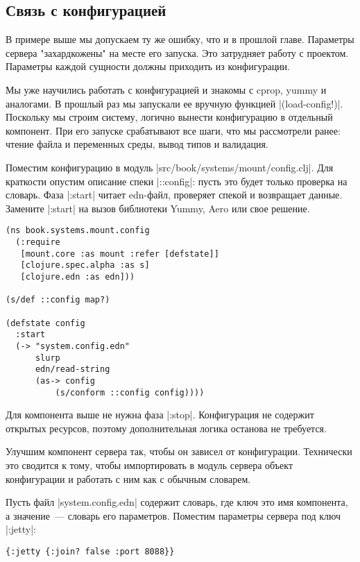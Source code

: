 \subsection{Связь с конфигурацией}

В примере выше мы допускаем ту же ошибку, что и в прошлой главе. Параметры
сервера "захардкожены" на месте его запуска. Это затрудняет работу с
проектом. Параметры каждой сущности должны приходить из конфигурации.

Мы уже научились работать с конфигурацией и знакомы с cprop, yummy и
аналогами. В прошлый раз мы запускали ее вручную функцией
\spverb|(load-config!)|. Поскольку мы строим систему, логично вынести конфигурацию в
отдельный компонент. При его запуске срабатывают все шаги, что мы рассмотрели
ранее: чтение файла и переменных среды, вывод типов и валидация.

Поместим конфигурацию в модуль \spverb|src/book/systems/mount/config.clj|. Для
краткости опустим описание спеки \spverb|::config|: пусть это будет только проверка на
словарь. Фаза \spverb|:start| читает edn-файл, проверяет спекой и возвращает
данные. Замените \spverb|:start| на вызов библиотеки Yummy, Aero или свое решение.

\begin{verbatim}
(ns book.systems.mount.config
  (:require
   [mount.core :as mount :refer [defstate]]
   [clojure.spec.alpha :as s]
   [clojure.edn :as edn]))

(s/def ::config map?)

(defstate config
  :start
  (-> "system.config.edn"
      slurp
      edn/read-string
      (as-> config
          (s/conform ::config config))))
\end{verbatim}

Для компонента выше не нужна фаза \spverb|:stop|. Конфигурация не содержит открытых
ресурсов, поэтому дополнительная логика останова не требуется.

Улучшим компонент сервера так, чтобы он зависел от конфигурации. Технически это
сводится к тому, чтобы импортировать в модуль сервера объект конфигурации и
работать с ним как с обычным словарем.

Пусть файл \spverb|system.config.edn| содержит словарь, где ключ это имя компонента, а
значение~--- словарь его параметров. Поместим параметры сервера под ключ \spverb|:jetty|:

\begin{verbatim}
{:jetty {:join? false :port 8088}}
\end{verbatim}

